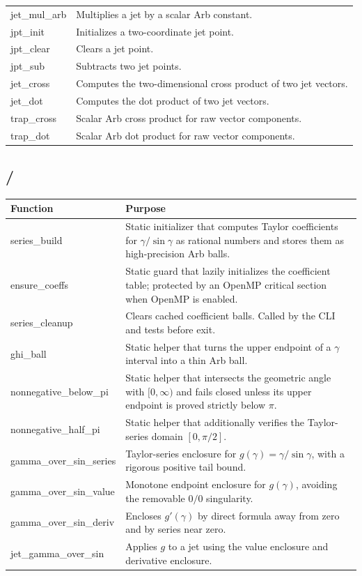 \documentclass[11pt]{article}
\DeclareRobustCommand{\code}[1]{\texttt{\detokenize{#1}}}
\begin{document}
\begin{longtable}{>{\ttfamily}p{}p{}}
jet\_mul\_arb & Multiplies a jet by a scalar Arb constant. \\
jpt\_init & Initializes a two-coordinate jet point. \\
jpt\_clear & Clears a jet point. \\
jpt\_sub & Subtracts two jet points. \\
jet\_cross & Computes the two-dimensional cross product of two jet vectors. \\
jet\_dot & Computes the dot product of two jet vectors. \\
trap\_cross & Scalar Arb cross product for raw vector components. \\
trap\_dot & Scalar Arb dot product for raw vector components. \\
\bottomrule
\end{longtable}

\subsection{\code{series.c}/\code{series.h}}

\begin{longtable}{>{\ttfamily}p{}p{}}
\toprule
Function & Purpose \\
\midrule
\endhead
series\_build & Static initializer that computes Taylor coefficients for \(\gamma/\sin\gamma\) as rational numbers and stores them as high-precision Arb balls. \\
ensure\_coeffs & Static guard that lazily initializes the coefficient table; protected by an OpenMP critical section when OpenMP is enabled. \\
series\_cleanup & Clears cached coefficient balls.  Called by the CLI and tests before exit. \\
ghi\_ball & Static helper that turns the upper endpoint of a \(\gamma\) interval into a thin Arb ball. \\
nonnegative\_below\_pi & Static helper that intersects the geometric angle with \([0,\infty)\) and fails closed unless its upper endpoint is proved strictly below \(\pi\). \\
nonnegative\_half\_pi & Static helper that additionally verifies the Taylor-series domain \([0,\pi/2]\). \\
gamma\_over\_sin\_series & Taylor-series enclosure for \(g(\gamma)=\gamma/\sin\gamma\), with a rigorous positive tail bound. \\
gamma\_over\_sin\_value & Monotone endpoint enclosure for \(g(\gamma)\), avoiding the removable \(0/0\) singularity. \\
gamma\_over\_sin\_deriv & Encloses \(g'(\gamma)\) by direct formula away from zero and by series near zero. \\
jet\_gamma\_over\_sin & Applies \(g\) to a jet using the value enclosure and derivative enclosure. \\
\bottomrule
\end{longtable}
\end{document}
